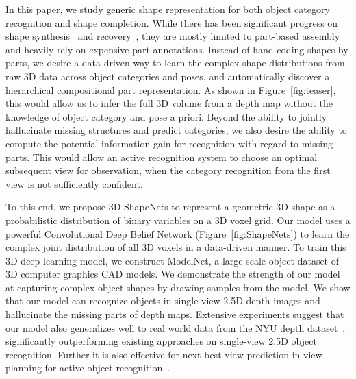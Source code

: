 \documentclass[10pt,twocolumn,letterpaper]{article}
\begin{document}
In this paper, we study generic shape representation for both object category recognition and shape completion. 
While there has been significant progress on shape synthesis~\cite{Sid2011,Sid2012} and recovery~\cite{Shen2012}, they are mostly limited to part-based assembly and 
heavily rely on expensive part annotations.
Instead of hand-coding shapes by parts, 
we desire a data-driven way to learn the complex shape distributions from raw 3D data across object categories and poses,
and automatically discover a hierarchical compositional part representation.
As shown in Figure~\ref{fig:teaser},
this would allow us to infer the full 3D volume from a depth map without 
the knowledge of object category and pose a priori.
Beyond the ability to jointly hallucinate missing structures and predict categories, 
we also desire the ability to compute the potential information gain for recognition with regard to missing parts.
This would allow an active recognition system to choose an optimal subsequent view for observation, when the category recognition from the first view is not sufficiently confident.







To this end,
we propose 3D ShapeNets to represent a geometric 3D shape as a probabilistic distribution of binary variables on a 3D voxel grid. Our model 
uses a powerful Convolutional Deep Belief Network (Figure~\ref{fig:ShapeNets}) to learn the complex joint distribution of all 3D voxels in a data-driven manner.
To train this 3D deep learning model, 
we construct ModelNet, a large-scale object dataset of 3D computer graphics CAD models.
We demonstrate the strength of our model at capturing complex object shapes by drawing samples from the model. 
We show that our model can recognize objects in single-view 2.5D depth images and hallucinate the missing parts of depth maps. 
Extensive experiments suggest that
our model also generalizes well to real world data from the NYU depth dataset~\cite{NYUdataset}, 
significantly outperforming existing approaches on single-view 2.5D object recognition.
Further it is also effective for next-best-view prediction in view planning for active object recognition~\cite{NBVsurveys}.
\end{document}
